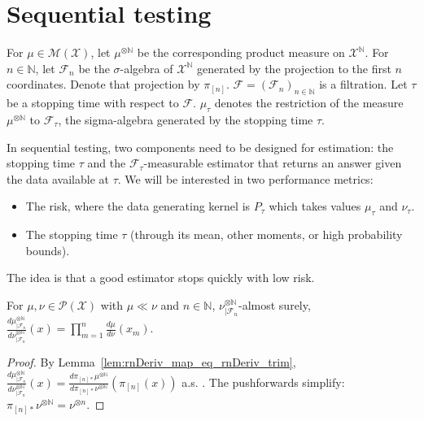 \section{Sequential testing}

For $\mu \in \mathcal M(\mathcal X)$, let $\mu^{\otimes \mathbb{N}}$ be the corresponding product measure on $\mathcal X^{\mathbb{N}}$.
For $n \in \mathbb{N}$, let $\mathcal F_n$ be the $\sigma$-algebra of $\mathcal X^{\mathbb{N}}$ generated by the projection to the first $n$ coordinates. Denote that projection by $\pi_{[n]}$.
$\mathcal F = (\mathcal F_n)_{n \in \mathbb{N}}$ is a filtration.
Let $\tau$ be a stopping time with respect to $\mathcal F$. $\mu_\tau$ denotes the restriction of the measure $\mu^{\otimes \mathbb{N}}$ to $\mathcal F_\tau$, the sigma-algebra generated by the stopping time $\tau$.

In sequential testing, two components need to be designed for estimation: the stopping time $\tau$ and the $\mathcal F_\tau$-measurable estimator that returns an answer given the data available at $\tau$.
We will be interested in two performance metrics:
\begin{itemize}
  \item The risk, where the data generating kernel is $P_\tau$ which takes values $\mu_\tau$ and $\nu_\tau$.
  \item The stopping time $\tau$ (through its mean, other moments, or high probability bounds).
\end{itemize}
The idea is that a good estimator stops quickly with low risk.

\begin{lemma}
  \label{lem:llr_filtration_nat}
  For $\mu, \nu \in \mathcal P(\mathcal X)$ with $\mu \ll \nu$ and $n \in \mathbb{N}$, $\nu^{\otimes \mathbb{N}}_{| \mathcal F_n}$-almost surely,
  $\frac{d \mu^{\otimes \mathbb{N}}_{| \mathcal F_n}}{d \nu^{\otimes \mathbb{N}}_{| \mathcal F_n}}(x) = \prod_{m=1}^n \frac{d \mu}{d \nu}(x_m)$.
\end{lemma}

\begin{proof}%
{}
By Lemma~\ref{lem:rnDeriv_map_eq_rnDeriv_trim}, $\frac{d \mu^{\otimes \mathbb{N}}_{| \mathcal F_n}}{d \nu^{\otimes \mathbb{N}}_{| \mathcal F_n}}(x) = \frac{d \pi_{[n]*}\mu^{\otimes \mathbb{N}}}{d \pi_{[n]*}\nu^{\otimes \mathbb{N}}}(\pi_{[n]}(x))$ a.s. . The pushforwards simplify: $\pi_{[n]*}\nu^{\otimes \mathbb{N}} = \nu^{\otimes n}$.
\end{proof}

